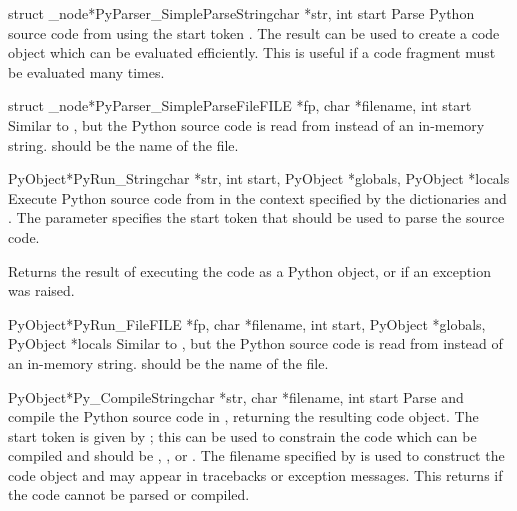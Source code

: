\documentclass{manual}
\begin{document}
\begin{cfuncdesc}{struct _node*}{PyParser_SimpleParseString}{char *str,
                                                             int start}
  Parse Python source code from  using the start token
  .  The result can be used to create a code object which
  can be evaluated efficiently.  This is useful if a code fragment
  must be evaluated many times.
\end{cfuncdesc}

\begin{cfuncdesc}{struct _node*}{PyParser_SimpleParseFile}{FILE *fp,
                                 char *filename, int start}
  Similar to , but the Python
  source code is read from  instead of an in-memory string.
   should be the name of the file.
\end{cfuncdesc}

\begin{cfuncdesc}{PyObject*}{PyRun_String}{char *str, int start,
                                           PyObject *globals,
                                           PyObject *locals}
  Execute Python source code from  in the context specified
  by the dictionaries  and .  The parameter
   specifies the start token that should be used to parse
  the source code.

  Returns the result of executing the code as a Python object, or
  \NULL{} if an exception was raised.
\end{cfuncdesc}

\begin{cfuncdesc}{PyObject*}{PyRun_File}{FILE *fp, char *filename,
                                         int start, PyObject *globals,
                                         PyObject *locals}
  Similar to , but the Python source code is 
  read from  instead of an in-memory string.
   should be the name of the file.
\end{cfuncdesc}

\begin{cfuncdesc}{PyObject*}{Py_CompileString}{char *str, char *filename,
                                               int start}
  Parse and compile the Python source code in , returning the 
  resulting code object.  The start token is given by ;
  this can be used to constrain the code which can be compiled and should
  be , , or
  .  The filename specified by
   is used to construct the code object and may appear
  in tracebacks or  exception messages.  This
  returns \NULL{} if the code cannot be parsed or compiled.
\end{cfuncdesc}
\end{document}
